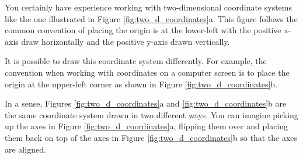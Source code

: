 You certainly have experience working with two-dimensional coordinate
systems like the one illustrated in Figure
\ref{fig:two_d_coordinates}a.  This figure follows the common
convention of placing the origin is at the lower-left with the
positive x-axis draw horizontally and the positive y-axis drawn
vertically.

It is possible to draw this coordinate system differently. For
example, the convention when working with coordinates on a computer
screen is to place the origin at the upper-left corner as shown in
Figure \ref{fig:two_d_coordinates}b.

In a sense, Figures \ref{fig:two_d_coordinates}a and
\ref{fig:two_d_coordinates}b are the same coordinate system drawn in
two different ways.  You can imagine picking up the axes in Figure
\ref{fig:two_d_coordinates}a, flipping them over and placing them back
on top of the axes in Figure \ref{fig:two_d_coordinates}b so that the
axes are aligned.


